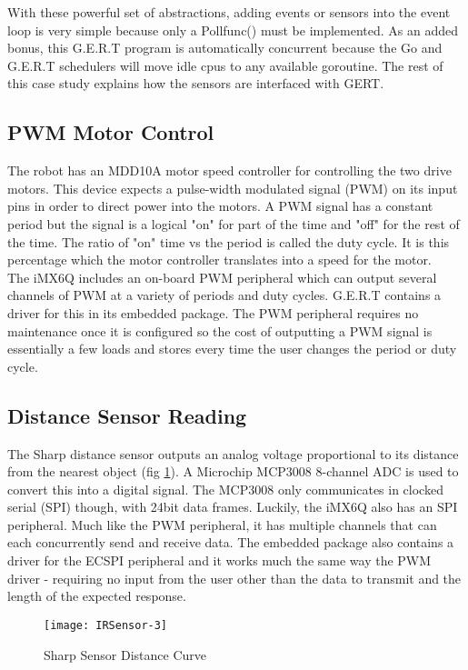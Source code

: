 With these powerful set of abstractions, adding events or sensors into the event loop
is very simple because only a Pollfunc() must be implemented. As an added bonus, this
G.E.R.T program is automatically concurrent because the Go and G.E.R.T schedulers will
move idle cpus to any available goroutine. The rest of this case study explains how the sensors
are interfaced with GERT.

\subsection{PWM Motor Control}
The robot has an MDD10A motor speed controller for controlling the two drive motors. This device
expects a pulse-width modulated signal (PWM) on its input pins in order to direct power into the
motors. A PWM signal has a constant period but the signal is a logical "on" for part of the time
and "off" for the rest of the time. The ratio of "on" time vs the period is called the duty cycle.
It is this percentage which the motor controller translates into a speed for the motor.\\

The iMX6Q includes an on-board PWM peripheral which can output several channels of PWM
at a variety of periods and duty cycles. G.E.R.T contains a driver for this in its embedded
package. The PWM peripheral requires no maintenance once it is configured so the cost of outputting
a PWM signal is essentially a few loads and stores every time the user changes the period or duty cycle.

\subsection{Distance Sensor Reading}
The Sharp distance sensor outputs an analog voltage proportional to its distance from the nearest object (fig \ref{fig:curve}).
A Microchip MCP3008 8-channel ADC is used to convert this into a digital signal. The MCP3008 only communicates in clocked
serial (SPI) though, with 24bit data frames. Luckily, the iMX6Q also has an SPI peripheral. Much like the
PWM peripheral, it has multiple channels that can each concurrently send and receive data. The embedded
package also contains a driver for the ECSPI peripheral and it works much the same way the PWM driver - 
requiring no input from the user other than the data to transmit and the length of the expected response.

\begin{figure}[h]
\begin{center}
  \texttt{[image: IRSensor-3]}
\end{center}
  \caption{Sharp Sensor Distance Curve} \label{fig:curve}
\end{figure}

